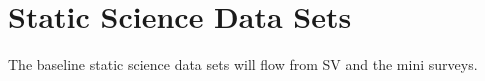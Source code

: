 \section{Static Science Data Sets} 
\label{sec:stat}


The baseline static science data sets will flow from SV and the mini surveys.

